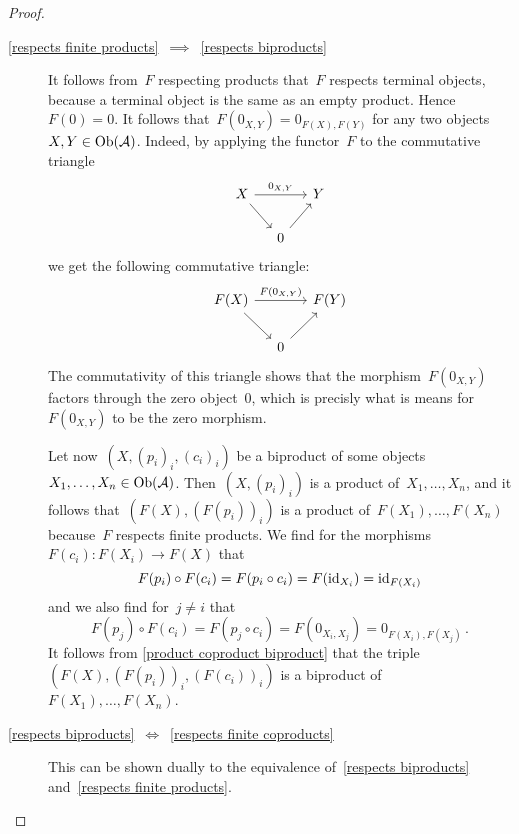 \begin{proof}
\begin{enumerate}
\begin{description}
        \item[\ref*{respects finite products}~$\implies$~\ref*{respects biproducts}]
          It follows from~$F$ respecting products that~$F$ respects terminal objects, because a terminal object is the same as an empty product.
          Hence~$F(0) = 0$.
          It follows that~$F(0_{X,Y}) = 0_{F(X), F(Y)}$ for any two objects~$X, Y \in \operatorname{Ob}(\mathcal{A})$.
          Indeed, by applying the functor~$F$ to the commutative triangle
          \[
            \begin{tikzcd}[column sep = small]
                X
                \arrow{rr}[above]{0_{X,Y}}
                \arrow{dr}
              & {}
              & Y
              \\
                {}
              & 0
                \arrow{ur}
              & {}
            \end{tikzcd}
          \]
          we get the following commutative triangle:
          \[
            \begin{tikzcd}[column sep = small]
                F(X)
                \arrow{rr}[above]{F(0_{X,Y})}
                \arrow{dr}
              & {}
              & F(Y)
              \\
                {}
              & 0
                \arrow{ur}
              & {}
            \end{tikzcd}
          \]
          The commutativity of this triangle shows that the morphism~$F(0_{X,Y})$ factors through the zero object~$0$, which is precisly what is means for~$F(0_{X,Y})$ to be the zero morphism.
          
          Let now~$(X, (p_i)_i, (c_i)_i)$ be a biproduct of some objects~$X_1, \dotsc, X_n \in \operatorname{Ob}(\mathcal{A})$.
          Then~$(X, (p_i)_i)$ is a product of~$X_1, \dotsc, X_n$, and it follows that~$(F(X), (F(p_i))_i)$ is a product of~$F(X_1), \dotsc, F(X_n)$ because~$F$ respects finite products.
          We find for the morphisms~$F(c_i) \colon F(X_i) \to F(X)$ that
          \[
              F(p_i) \circ F(c_i)
            = F(p_i \circ c_i)
            = F( \operatorname{id}_{X_i} )
            = \operatorname{id}_{F(X_i)}
          \]
          and we also find for~$j \neq i$ that
          \[
              F(p_j) \circ F(c_i)
            = F(p_j \circ c_i)
            = F(0_{X_i, X_j})
            = 0_{F(X_i), F(X_j)} \,.
          \]
          It follows from \cref{product coproduct biproduct} that the triple~$(F(X), (F(p_i))_i, (F(c_i))_i)$ is a biproduct of~$F(X_1), \dotsc, F(X_n)$.
          
        \item[\ref*{respects biproducts}~$\iff$~\ref*{respects finite coproducts}]
          This can be shown dually to the equivalence of~\ref*{respects biproducts} and~\ref*{respects finite products}.
        

\end{description}
\end{enumerate}
\end{proof}
